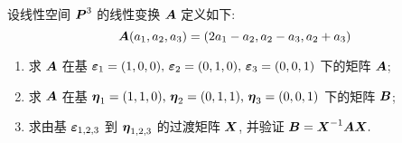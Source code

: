 \begin{example}
    设线性空间 $\vb*{P}^3$ 的线性变换 $\vb*{A}$ 定义如下:
    $$\vb*{A}(a_1,a_2,a_3)=(2a_1-a_2,a_2-a_3,a_2+a_3)$$
    \begin{enumerate}[label=(\arabic{*})]
        \item 求 $\vb*{A}$ 在基 $\vb*{\varepsilon}_1=(1,0,0)\text{, }\vb*{\varepsilon}_2=(0,1,0)\text{, }\vb*{\varepsilon}_3=(0,0,1)$ 下的矩阵 $\vb*{A}$;
        \item 求 $\vb*{A}$ 在基 $\vb*{\eta}_1=(1,1,0)\text{, }\vb*{\eta}_2=(0,1,1)\text{, }\vb*{\eta}_3=(0,0,1)$ 下的矩阵 $\vb*{B}$;
        \item 求由基 $\vb*{\varepsilon}_{1,2,3}$ 到 $\vb*{\eta}_{1,2,3}$ 的过渡矩阵 $\vb*{X}$, 并验证 $\vb*{B}=\vb*{X}^{-1}\vb*{AX}.$
    \end{enumerate}
\end{example}
